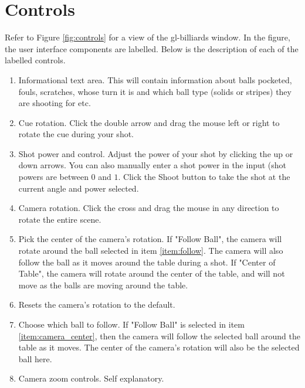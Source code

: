 
\section{Controls}
Refer to Figure \ref{fig:controls} for a view of the gl-billiards window. In the figure, the user interface components are labelled.
Below is the description of each of the labelled controls.

\begin{enumerate}
    \item Informational text area. This will contain information about balls pocketed, fouls, scratches, whose turn it is
    and which ball type (solids or stripes) they are shooting for etc.
    
    \item Cue rotation. Click the double arrow and drag  the mouse left or right to rotate the cue during your shot.

    \item Shot power and control. Adjust the power of your shot by clicking the up or down arrows. You can also manually enter
    a shot power in the input (shot powers are between $0$ and $1$. Click the Shoot button to take the shot at the current angle and power selected.
    
    \item Camera rotation. Click the cross and drag the mouse in any direction to rotate the entire scene.
    
    \item Pick the center of the camera's rotation. If "Follow Ball", the camera will rotate around the ball selected in item \ref{item:follow}.
    The camera will also follow the ball as it moves around the table during a shot. If "Center of Table", the camera will rotate around the center
    of the table, and will not move as the balls are moving around the table.   \label{item:camera_center}
    
    \item Resets the camera's rotation to the default.
    
    \item Choose which ball to follow. If "Follow Ball" is selected in item \ref{item:camera_center}, then the camera will follow the selected
    ball around the table as it moves. The center of the camera's rotation will also be the selected ball here. \label{item:follow}
    
    \item Camera zoom controls. Self explanatory.
    
\end{enumerate}

